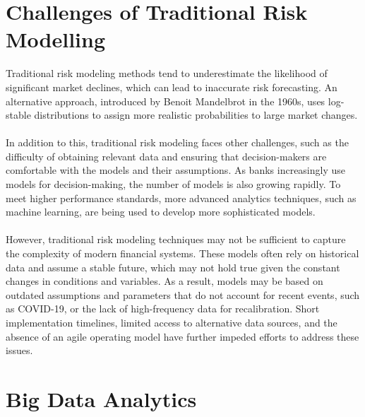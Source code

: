 \section{Challenges of Traditional Risk Modelling}
Traditional risk modeling methods tend to underestimate the likelihood of significant market declines, which can 
lead to inaccurate risk forecasting. An alternative approach, introduced by Benoit Mandelbrot in the 1960s, uses 
log-stable distributions to assign more realistic probabilities to large market changes.\\\\
In addition to this, traditional risk modeling faces other challenges, such as the difficulty of obtaining relevant 
data and ensuring that decision-makers are comfortable with the models and their assumptions. As banks increasingly 
use models for decision-making, the number of models is also growing rapidly. To meet higher performance standards, 
more advanced analytics techniques, such as machine learning, are being used to develop more sophisticated models.\\\\
However, traditional risk modeling techniques may not be sufficient to capture the complexity of modern financial 
systems. These models often rely on historical data and assume a stable future, which may not hold true given the 
constant changes in conditions and variables. As a result, models may be based on outdated assumptions and 
parameters that do not account for recent events, such as COVID-19, or the lack of high-frequency data for 
recalibration. Short implementation timelines, limited access to alternative data sources, and the absence of an 
agile operating model have further impeded efforts to address these issues.

\section{Big Data Analytics}

